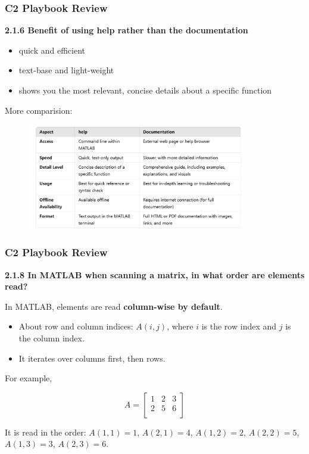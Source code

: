 \documentclass[
	11pt, %
]{beamer}
\begin{document}

\begin{frame}
	\frametitle{C2 Playbook Review}
	\textbf{2.1.6 Benefit of using help rather than the documentation}
    \begin{itemize}
        \item quick and efficient
        \item text-base and light-weight
        \item shows you the most relevant, concise details about a specific function
    \end{itemize}
    
    More comparision:

    \begin{figure}
        \centering
        \includegraphics[width=0.85\textwidth]{doc_help.png}
    \end{figure}
    \end{frame}

\begin{frame}
    \frametitle{C2 Playbook Review}
    \textbf{2.1.8 In MATLAB when scanning a matrix, in what order are elements read?}

    In MATLAB, elements are read \textbf{column-wise by default}.

    \begin{itemize}
        \item About row and column indices: $A(i,j)$, where $i$ is the row index and $j$ is the column index.
        \item It iterates over columns first, then rows.
    \end{itemize}

    For example, 
    \begin{center}
        \[
        A = \begin{bmatrix}
        1 & 2 & 3 \\
        2 & 5 & 6\\
        \end{bmatrix}
        \]
    \end{center}
    It is read in the order: $A(1,1)=1$, $A(2,1)=4$, $A(1,2)=2$, $A(2,2)=5$, $A(1,3)=3$, $A(2,3)=6$.
\end{frame}
\end{document}
